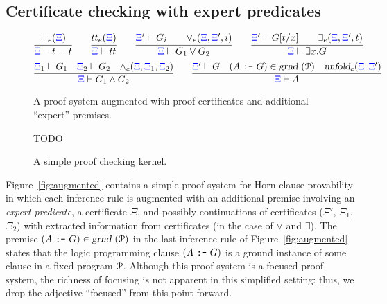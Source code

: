 \subsection{Certificate checking with expert predicates}
\label{ssec:fpc}




\begin{figure}
\newcommand{\XXi}{{\color{blue}{\Xi}}}
\[
\infer{\XXi\vdash t = t}
      {\eqExpert{\XXi}}
\qquad
\infer{\XXi\vdash \true}
      {\trueExpert{\XXi}}
\qquad
\infer{\XXi\vdash G_1\vee G_2}
      {\XXi'\vdash G_i\qquad \orExpert{\XXi}{\XXi'}{i}}
\qquad
\infer{\XXi\vdash \exists x. G}
      {\XXi'\vdash G[t/x]\qquad \someExpert{\XXi}{\XXi'}{t}}
\]
\vskip -6pt
\[
\infer{\XXi\vdash G_1\wedge G_2}
      {\XXi_1\vdash G_1\quad \XXi_2\vdash G_2\quad \andExpert{\XXi}{\XXi_1}{\XXi_2}}
\qquad
\infer{\XXi\vdash A}
      {\XXi'\vdash G \quad (A~\hbox{\tt :-}~G)\in\instan\Pscr
                     \quad \unfoldExpert{\XXi}{\XXi'}}
\]
\caption{A proof system augmented with proof certificates and
  additional ``expert'' premises.}
\label{fig:augmented}
TODO
%
%
\caption{A simple proof checking kernel.}
\label{fig:kernel}
\end{figure}

Figure~\ref{fig:augmented} contains a simple proof system for Horn
clause provability in which each inference rule is augmented with an
additional premise involving an \emph{expert predicate}, a
certificate $\Xi$, and possibly continuations of certificates ($\Xi'$,
$\Xi_1$, $\Xi_2$) with extracted information from certificates (in the
case of $\vee$ and $\exists$).
%
%
The premise $(A~\hbox{\tt :-}~G)\in\hbox{\sl grnd}~({\mathcal P})$ in the last
inference rule of Figure~\ref{fig:augmented} states that the logic
programming clause $(A~\hbox{\tt :-}~G)$ is a ground instance of some
clause in a fixed program ${\mathcal P}$.
%
Although this proof system is a focused proof system, the
richness of focusing is not apparent in this simplified 
setting: thus, we drop the adjective ``focused'' from this point forward.

